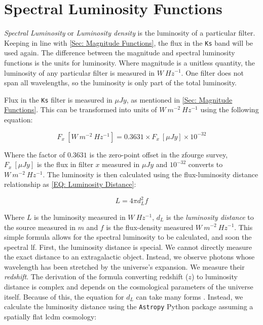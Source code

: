 \section{Spectral Luminosity Functions} \label{Sec: Spectral Functions}
\textit{Spectral Luminosity} or \textit{Luminosity density} is the luminosity of a particular filter. Keeping in line with \cref{Sec: Magnitude Functions}, the flux in the \texttt{Ks} band will be used again. The difference between the magnitude and spectral luminosity functions is the units for luminosity. Where magnitude is a unitless quantity, the luminosity of any particular filter is measured in $W\ Hz^{-1}$. One filter does not span all wavelengths, so the luminosity is only part of the total luminosity.

Flux in the \texttt{Ks} filter is measured in $\mu Jy$, as mentioned in \cref{Sec: Magnitude Functions}. This can be transformed into units of $W\ m^{-2}\ Hz^{-1}$ using the following equation:

\begin{equation}
    F_x\ [W\ m^{-2}\ Hz^{-1}] = 0.3631 \times F_x\ [\mu Jy] \times 10^{-32}
\end{equation}

Where the factor of $0.3631$ is the zero-point offset in the \gls{zfourge} survey, $F_x\ [\mu Jy]$ is the flux in filter $x$ measured in $\mu Jy$ and $10^{-32}$ converts to $W\ m^{-2}\ Hz^{-1}$. The luminosity is then calculated using the flux-luminosity distance relationship as \cref{EQ: Luminosity Distance}:

\begin{equation}
    L = 4\pi d_L^2 f
    \label{EQ: Luminosity Distance}
\end{equation}

Where $L$ is the luminosity measured in $W\ Hz^{-1}$, $d_L$ is the \textit{luminosity distance} to the source measured in $m$ and $f$ is the flux-density measured $W\ m^{-2}\ Hz^{-1}$. This simple formula allows for the spectral luminosity to be calculated, and soon the spectral \gls{lf}. First, the luminosity distance is special. We cannot directly measure the exact distance to an extragalactic object. Instead, we observe photons whose wavelength has been stretched by the universe's expansion. We measure their \textit{redshift}. The derivation of the formula converting redshift ($z$) to luminosity distance is complex and depends on the cosmological parameters of the universe itself. Because of this, the equation for $d_L$ can take many forms \citep{weinberg_gravitation_1972, hogg_distance_1999}. Instead, we calculate the luminosity distance using the \texttt{Astropy} Python package \citep{astropy_collaboration_astropy_2022} assuming a spatially flat \gls{lcdm} cosmology:

